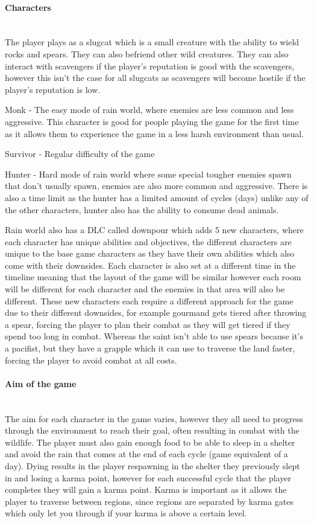 \documentclass{article}
\newcommand{\parBr}{\vspace{5mm}}%
\newcommand{\myparagraph}[1]{\paragraph{#1}\mbox{}\\} %
\begin{document}
\myparagraph{Characters}
The player plays as a slugcat which is a small creature with the ability to wield rocks and spears. They can also befriend other wild creatures. They can also interact with scavengers if the player's reputation is good with the scavengers, however this isn't the case for all slugcats as scavengers will become hostile if the player's reputation is low. 

\parBr

Monk - The easy mode of rain world, where enemies are less common and less aggressive. This character is good for people playing the game for the first time as it allows them to experience the game in a less harsh environment than usual.

\parBr

Survivor - Regular difficulty of the game

\parBr

Hunter - Hard mode of rain world where some special tougher enemies spawn that don't usually spawn, enemies are also more common and aggressive. There is also a time limit as the hunter has a limited amount of cycles (days) unlike any of the other characters, hunter also has the ability to consume dead animals.

\parBr

Rain world also has a DLC called downpour which adds 5 new characters, where each character has unique abilities and objectives, the different characters are unique to the base game characters as they have their own abilities which also come with their downsides. Each character is also set at a different time in the timeline meaning that the layout of the game will be similar however each room will be different for each character and the enemies in that area will also be different. These new characters each require a different approach for the game due to their different downsides, for example gourmand gets tiered after throwing a spear, forcing the player to plan their combat as they will get tiered if they spend too long in combat. Whereas the saint isn't able to use spears because it's a pacifist, but they have a grapple which it can use to traverse the land faster, forcing the player to avoid combat at all costs. 

\myparagraph{Aim of the game}
The aim for each character in the game varies, however they all need to progress through the environment to reach their goal, often resulting in combat with the wildlife. The player must also gain enough food to be able to sleep in a shelter and avoid the rain that comes at the end of each cycle (game equivalent of a day). Dying results in the player respawning in the shelter they previously slept in and losing a karma point, however for each successful cycle that the player completes they will gain a karma point. Karma is important as it allows the player to traverse between regions, since regions are separated by karma gates which only let you through if your karma is above a certain level. 
\end{document}
